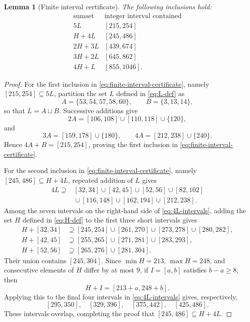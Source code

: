 \documentclass[12pt]{article}
\theoremstyle{plain}
\newtheorem{lemma}[theorem]{Lemma}
\begin{document}
\begin{lemma}[Finite interval certificate]\label{lem:finitefive}
The following inclusions hold:
\begin{equation}\label{eq:finite-interval-certificate}
\begin{array}{c|c}
\text{sumset}&\text{integer interval contained}\\ \hline
5L &[215,254]\\
H+4L &[245,486]\\
2H+3L &[439,674]\\
3H+2L &[645,862]\\
4H+L &[855,1046].
\end{array}
\end{equation}
\end{lemma}

\begin{proof}
For the first inclusion in
\eqref{eq:finite-interval-certificate}, namely
$[215,254]\subseteq5L$, partition the set $L$ defined in
\eqref{eq:L-def} as
\[
 A=\{53,54,57,58,60\},\qquad B=\{3,13,14\},
\]
so that $L=A\sqcup B$.  Successive additions give
\[
 2A=[106,108]\cup[110,118]\cup\{120\},
\]
and
\[
 3A=[159,178]\cup\{180\},\qquad
 4A=[212,238]\cup\{240\}.
\]
Hence $4A+B=[215,254]$, proving the first inclusion in
\eqref{eq:finite-interval-certificate}.

For the second inclusion in
\eqref{eq:finite-interval-certificate}, namely
$[245,486]\subseteq H+4L$, repeated addition of $L$ gives
\begin{equation}\label{eq:4L-intervals}
\begin{split}
4L\supseteq{}&[32,34]\cup[42,45]\cup[52,56]\cup[82,102]\\
 &{}\cup[116,148]\cup[162,194]\cup[212,238].
\end{split}
\end{equation}
Among the seven intervals on the right-hand side of
\eqref{eq:4L-intervals}, adding the set $H$ defined in
\eqref{eq:H-def} to the first three short intervals gives
\[
\begin{aligned}
H+[32,34]&\supseteq[245,254]\cup[261,270]
 \cup[273,278]\cup[280,282],\\
H+[42,45]&\supseteq[255,265]\cup[271,281]\cup[283,293],\\
H+[52,56]&\supseteq[265,276]\cup[281,304].
\end{aligned}
\]
Their union contains $[245,304]$.  Since $\min H=213$,
$\max H=248$, and consecutive elements of $H$ differ by at most $9$,
if $I=[a,b]$ satisfies $b-a\geq8$, then
\[
 H+I=[213+a,248+b].
\]
Applying this to the final four intervals in
\eqref{eq:4L-intervals} gives, respectively,
\[
 [295,350],\quad[329,396],\quad[375,442],\quad[425,486].
\]
These intervals overlap, completing the proof that
$[245,486]\subseteq H+4L$.


\end{proof}
\end{document}
